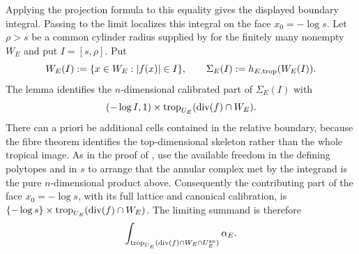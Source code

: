 Applying the projection formula to this equality gives the displayed
boundary integral.  Passing to the limit localizes this integral on the
face $x_0=-\log s$.  Let $\rho>s$ be a common cylinder radius supplied by
 for the finitely many nonempty $W_E$ and put
$I=[s,\rho]$.  Put
\[
 W_E(I):=\{x\in W_E:|f(x)|\in I\},\qquad
 \Sigma_E(I):=h_{E,\mathrm{trop}}(W_E(I)).
\]
The lemma identifies the $n$-dimensional calibrated part of $\Sigma_E(I)$ with
\[
 (-\log I,1)\times
 \operatorname{trop}_{U_E}(\operatorname{div}(f)\cap W_E).
\]
There can a priori be additional cells contained in the relative boundary,
because the fibre theorem identifies the top-dimensional skeleton rather
than the whole tropical image.  As in the proof of
\cite[Lemma~7.3, equations~(7.3.8)--(7.3.9)]{GK17}, use the available
freedom in the defining polytopes and in $s$ to arrange that the annular
complex met by the integrand is the pure
$n$-dimensional product above.
Consequently the contributing part of the face $x_0=-\log s$, with its
full lattice and canonical calibration, is
\(
 \{-\log s\}\times
 \operatorname{trop}_{U_E}(\operatorname{div}(f)\cap W_E)
\).
The limiting summand is therefore
\[
        \int_{\operatorname{trop}_{U_E}
          (\operatorname{div}(f)\cap W_E\cap U_E^{\mathrm{an}})}\alpha_E .
\]
